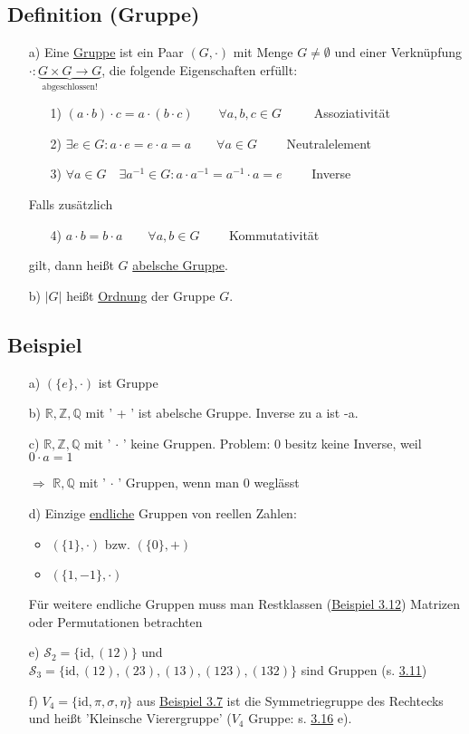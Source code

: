 \documentclass[12pt,titlepage, pdf]{article}
\newcommand{\R}{\mathds{R}}
\newcommand{\uline}[1]{\underline{#1}}
\newcommand{\id}{\textrm{id}}
\renewcommand{\>}{\rightarrow}
\renewcommand{\*}{\cdot}
\begin{document}
	\subsection{Definition (Gruppe)}
	\begin{itemize}
		\item[a)] Eine \uline{Gruppe} ist ein Paar $(G, \cdot) $ mit Menge $G \neq \emptyset$ und einer Verknüpfung $\cdot : \underbrace{G \times G \rightarrow G}_{\text{abgeschlossen!}}$, die folgende Eigenschaften erfüllt:
		\begin{itemize}
			\item[1)] $(a \cdot b) \cdot c = a \cdot (b \cdot c) \qquad \forall a,b,c \in G\qquad~$ Assoziativität
			\item[2)] $\exists e \in G: a \cdot e = e \cdot a = a \qquad \forall a \in G\qquad$ Neutralelement
			\item[3)] $\forall a \in G\quad \exists a^{-1} \in G: a \cdot a^{-1} = a^{-1}\*a = e\qquad$ Inverse
		\end{itemize}
		Falls zusätzlich 
		\begin{itemize}
			\item[4)] $a \cdot b = b \cdot a \qquad  \forall a,b \in G\qquad$ Kommutativität \end{itemize}
		gilt, dann heißt $G$ \uline{abelsche Gruppe}.
		
		\item[b)] $| G |$ heißt \uline{Ordnung} der Gruppe $G$.
	\end{itemize}
	\subsection{Beispiel}
	\label{3.10}
	\begin{itemize}
		\item[a)] $(\{e\}, \cdot )$ ist Gruppe
		\item[b)] $\R, \mathds{Z}, \mathds{Q}$ mit ' + ' ist abelsche Gruppe. Inverse zu a ist -a.
		\item[c)] $\R, \mathds{Z}, \mathds{Q}$ mit ' $\cdot$ ' keine Gruppen. Problem: 0 besitz keine Inverse, weil \\
		$0 \cdot a = 1$\Lightning
		\item[$\Rightarrow$]  $\R, \mathds{Q}$ mit ' $\cdot$ ' Gruppen, wenn man 0 weglässt
		\item[d)] Einzige \uline{endliche} Gruppen von reellen Zahlen: 
		\begin{itemize}
			\item $(\{1\}, \cdot )$ bzw. $(\{0\}, + )$
			\item $(\{1,-1\}, \cdot)$
		\end{itemize}
		Für weitere endliche Gruppen muss man Restklassen (\hyperref[3.12]{Beispiel 3.12}) Matrizen oder Permutationen betrachten
		\item[e)] $\mathscr{S}_2 = \{\id, (12)\}$ und \\
		$\mathscr{S}_3 = \{\id, (12), (23),(13),(123),(132)\}$ sind Gruppen (s. \hyperref[3.11]{3.11})
		\item[f)] $V_4 = \{\id, \pi, \sigma, \eta \}$ aus \hyperref[3.7]{Beispiel 3.7} ist die Symmetriegruppe des Rechtecks und heißt 'Kleinsche Vierergruppe' ($V_4$ Gruppe: s. \hyperref[3.16]{3.16} e).
	\end{itemize}
\end{document}
